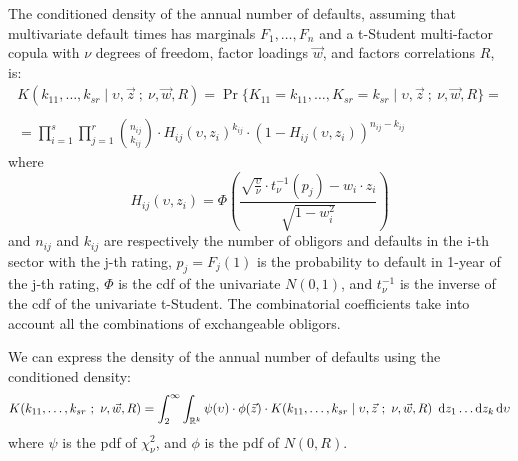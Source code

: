 \documentclass[11pt,fleqn]{book} %
\begin{document}
\begin{proposition}
	\label{prop:cdand}
	The conditioned density of the annual number of defaults, assuming 
	that multivariate default times has marginals $F_1,\dots,F_n$ and a 
	t-Student multi-factor copula with $\nu$ degrees of freedom, factor 
	loadings $\vec{w}$, and factors correlations $R$, is:
	\begin{displaymath}
		\begin{array}{l}
			K(k_{11},\dots,k_{sr} \mid \upsilon,\vec{z}\ ;\ \nu,\vec{w}, R) = 
			\Pr\{K_{11}=k_{11},\dots,K_{sr}=k_{sr} \mid \upsilon,\vec{z}\ ;\ \nu, \vec{w}, R\} = \\
			\\
			= \displaystyle \prod_{i=1}^s \prod_{j=1}^r \binom{n_{ij}}{k_{ij}} \cdot
			H_{ij}(\upsilon,z_i)^{k_{ij}} \cdot
			\left( 1 - H_{ij}(\upsilon,z_i) \right)^{n_{ij}-k_{ij}}
		\end{array}
	\end{displaymath}
	where
	\begin{displaymath}
		H_{ij}(\upsilon,z_i) = \Phi\left(  
		\frac{\sqrt{\frac{\upsilon}{\nu}} \cdot t_{\nu}^{-1}(p_j) - w_i\cdot z_i}{\sqrt{1-w_i^2}}
		\right)
	\end{displaymath}
	and $n_{ij}$ and $k_{ij}$ are respectively the number of obligors and 
	defaults in the i-th sector with the j-th rating, $p_j = F_j(1)$ 
	is the probability to default in 1-year of the j-th rating,
	$\Phi$ is the cdf of the univariate $N(0,1)$, and $t_{\nu}^{-1}$ is the 
	inverse of the cdf of the univariate t-Student. The combinatorial coefficients 
	take into account all the combinations of exchangeable obligors.
\end{proposition}

\begin{corollary}
	We can express the density of the annual number of defaults using 
	the conditioned density:
	\begin{displaymath}
			K(k_{11},\dots,k_{sr}\ ;\ \nu, \vec{w}, R) = %
			\displaystyle \int_2^{\infty} \int_{\mathbb{R}^k}
			\psi(\upsilon) \cdot \phi(\vec{z}) \cdot
			K(k_{11},\dots,k_{sr} \mid \upsilon,\vec{z}\ ;\ \nu,\vec{w}, R) 
			\ \ud z_1 \dots \ud z_k \ud \upsilon
	\end{displaymath}
	where $\psi$ is the pdf of $\chi_{\nu}^2$, and $\phi$ is the pdf of $N(0,R)$.
\end{corollary}
\end{document}
